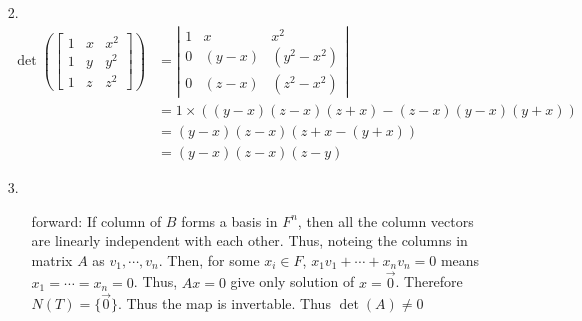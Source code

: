 \documentclass{article}
\begin{document}
\begin{itemize}
    \item [2.]
    \begin{align*}
        \det\left(
            \begin{bmatrix}
                1&x&x^2\\
                1&y&y^2\\
                1&z&z^2
            \end{bmatrix}\right)&=\left|\begin{matrix}
                1&x&x^2\\
                0&(y-x)&(y^2-x^2)\\
                0&(z-x)&(z^2-x^2)
            \end{matrix}\right|\\
            &=1\times ((y-x)(z-x)(z+x)-(z-x)(y-x)(y+x))\\
            &=(y-x)(z-x)(z+x-(y+x))\\
            &=(y-x)(z-x)(z-y)
    \end{align*}
    \item [3.]\
    \begin{itemize}
        \item [forward:] If column of \(B\) forms a basis in \(F^n\), then all the column vectors are linearly independent with each other. Thus, noteing the columns in matrix \(A\) as \(v_1,\cdots,v_n\).
        Then, for some \(x_i\in F\), \(x_1v_1+\cdots+x_nv_n=0\) means \(x_1=\cdots=x_n=0\). Thus, \(Ax=0\) give only solution of \(x = \overrightarrow{0}\). Therefore \(N(T)=\{\overrightarrow{0}\}\). Thus the map is 
        invertable. Thus \(\det(A)\neq 0\)


\end{itemize}
\end{itemize}
\end{document}
